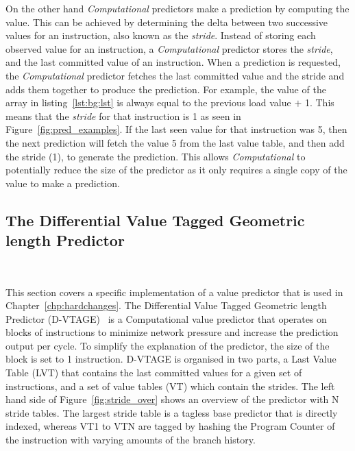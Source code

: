 On the other hand \textit{Computational} predictors make a prediction by computing the value.
This can be achieved by determining the delta between two successive values for an instruction, also known as the \textit{stride}.
Instead of storing each observed value for an instruction, a \textit{Computational} predictor stores the \textit{stride}, and the last committed value of an instruction.
When a prediction is requested, the \textit{Computational} predictor fetches the last committed value and the stride and adds them together to produce the prediction.
For example, the value of the array in listing~\ref{lst:bg:lst} is always equal to the previous load value $+$ 1.
This means that the \textit{stride} for that instruction is 1 as seen in Figure~\ref{fig:pred_examples}.
If the last seen value for that instruction was 5, then the next prediction will fetch the value 5 from the last value table, and then add the stride (1), to generate the prediction.
This allows \textit{Computational} to potentially reduce the size of the predictor as it only requires a single copy of the value to make a prediction. 


\subsection{The Differential Value Tagged Geometric length Predictor}~\label{chp:bck:vtage}

This section covers a specific implementation of a value predictor that is used in Chapter~\ref{chp:hardchanges}.
The Differential Value Tagged Geometric length Predictor (D-VTAGE)~\cite{peraisBeBop2015} is a Computational value predictor that operates on blocks of instructions to minimize network pressure and increase the prediction output per cycle.
To simplify the explanation of the predictor, the size of the block is set to 1 instruction.
D-VTAGE is organised in two parts, a Last Value Table (LVT) that contains the last committed values for a given set of instructions, and a set of value tables (VT) which contain the strides.
The left hand side of Figure~\ref{fig:stride_over} shows an overview of the predictor with N stride tables.
The largest stride table is a tagless base predictor that is directly indexed, whereas VT1 to VTN are tagged by hashing the Program Counter of the instruction with varying amounts of the branch history.

